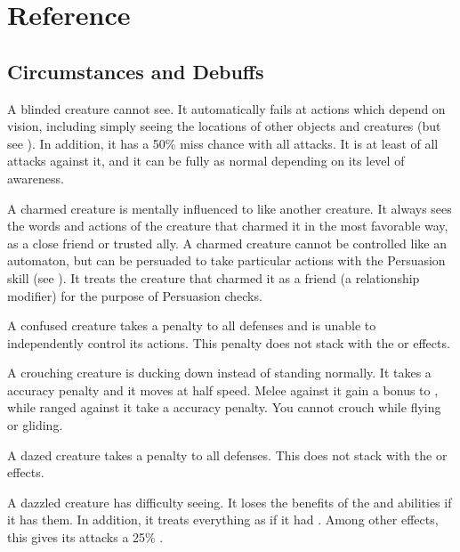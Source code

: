\chapter{Reference}\label{Reference}

\section{Circumstances and Debuffs}\label{Circumstances and Debuffs}

 A blinded creature cannot see.
It automatically fails at actions which depend on vision, including simply seeing the locations of other objects and creatures (but see ).
In addition, it has a 50\% miss chance with all attacks.
It is at least \partiallyunaware of all attacks against it, and it can be fully \unaware as normal depending on its level of awareness.

 A charmed creature is mentally influenced to like another creature.
It always sees the words and actions of the creature that charmed it in the most favorable way, as a close friend or trusted ally.
A charmed creature cannot be controlled like an automaton, but can be persuaded to take particular actions with the Persuasion skill (see ).
It treats the creature that charmed it as a friend (a  relationship modifier) for the purpose of Persuasion checks.

 A confused creature takes a  penalty to all defenses and is unable to independently control its actions.
This penalty does not stack with the \dazed or \stunned effects.
\confusionexplanation

 A crouching creature is ducking down instead of standing normally.
It takes a  accuracy penalty and it moves at half speed.
Melee  against it gain a  bonus to , while ranged  against it take a  accuracy penalty.
You cannot crouch while flying or gliding.

 A dazed creature takes a  penalty to all defenses.
This does not stack with the \stunned or \confused effects.

 A dazzled creature has difficulty seeing.
It loses the benefits of the  and  abilities if it has them.
In addition, it treats everything as if it had .
Among other effects, this gives its attacks a 25\% .

